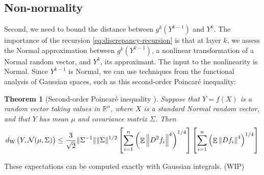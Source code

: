 \documentclass[oneside, article]{memoir}
\newtheorem{theorem}{Theorem}
\DeclareMathOperator{\expect}{\mathbb{E}}
\begin{document}
\subsection{Non-normality}
Second, we need to bound the distance between \(g^k(Y^{k-1})\) and \(Y^k\).
The importance of the recursion \eqref{eq:discrepancy-recursion} is that at layer \(k\), we assess the Normal approximation between \(g^k(Y^{k-1})\), a nonlinear transformation of a Normal random vector, and \(Y^k\), its approximant.
The input to the nonlinearity is Normal.
Since \(Y^{k-1}\) is Normal, we can use techniques from the functional analysis of Gaussian spaces, such as this second-order Poincar\'e inequality:
\begin{theorem}[Second-order Poincar\'e inequality {\cite[Theorem~7.1]{nourdin_second_2009}}]
Suppose that \(Y = f(X)\) is a random vector taking values in \(\mathbb{R}^n\), where \(X\) is a standard Normal random vector, and that \(Y\) has mean \(\mu\) and covariance matrix \(\Sigma\).
Then
\begin{align*}
  d_\mathrm{W}\del{Y, \mathcal N(\mu, \Sigma)}
  \leq \frac{3}{\sqrt 2} \|\Sigma^{-1}\| \|\Sigma\|^{1/2}
  \sbr{\sum_{i = 1}^n \del{\expect \left\|D^2 f_i\right\|^4}^{1/4}}
  \sbr{\sum_{i = 1}^n \del{\expect \left\|D f_i\right\|^4}^{1/4}}
\end{align*}
\end{theorem}

These expectations can be computed exactly with Gaussian integrals.
(WIP)
\end{document}
